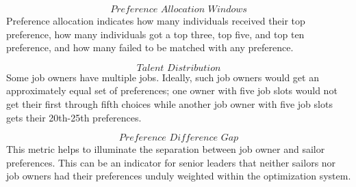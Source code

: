 \[\textit{Preference Allocation Windows}\]
Preference allocation indicates how many individuals received their top preference, how many individuals got a top three, top five, and top ten preference, and how many failed to be matched with any preference.

\[\textit{Talent Distribution}\]
Some job owners have multiple jobs. Ideally, such job owners would get an approximately equal set of preferences; one owner with five job slots would not get their first through fifth choices while another job owner with five job slots gets their 20th-25th preferences. 

\[\textit{Preference Difference Gap}\]
This metric helps to illuminate the separation between job owner and sailor preferences. This can be an indicator for senior leaders that neither sailors nor job owners had their preferences unduly weighted within the optimization system.  